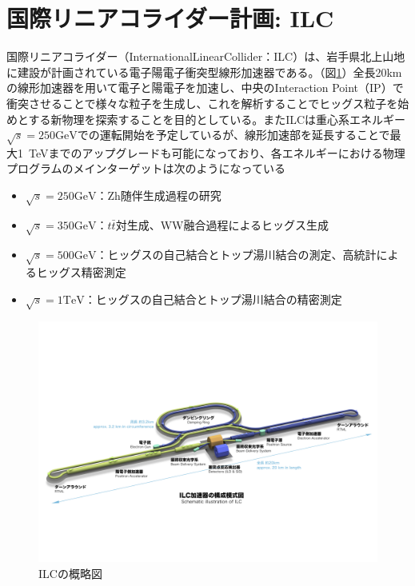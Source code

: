 \section{国際リニアコライダー計画: ILC}
国際リニアコライダー（InternationalLinearCollider：ILC）は、岩手県北上山地に建設が計画されている電子陽電子衝突型線形加速器である。（図\ref{ilc}）全長20kmの線形加速器を用いて電子と陽電子を加速し、中央のInteraction Point（IP）で衝突させることで様々な粒子を生成し、これを解析することでヒッグス粒子を始めとする新物理を探索することを目的としている。またILCは重心系エネルギー$\sqrt{s} = 250\mathrm{GeV}$での運転開始を予定しているが、線形加速部を延長することで最大1\ TeVまでのアップグレードも可能になっており、各エネルギーにおける物理プログラムのメインターゲットは次のようになっている\\
\begin{itemize}
\item $\sqrt{s} = 250 \mathrm{GeV}$：Zh随伴生成過程の研究
\item $\sqrt{s} = 350 \mathrm{GeV}$：$t\bar{t}$対生成、WW融合過程によるヒッグス生成
\item $\sqrt{s} = 500 \mathrm{GeV}$：ヒッグスの自己結合とトップ湯川結合の測定、高統計によるヒッグス精密測定
\item $\sqrt{s} = 1 \mathrm{TeV}$：ヒッグスの自己結合とトップ湯川結合の精密測定
\end{itemize}
\begin{figure}[t]
	\begin{center}
 \includegraphics[keepaspectratio, scale=0.4]
 	{Figure/Introduction/ilc.jpg}
 		\caption{ILCの概略図}
 		\label{ilc}
	\end{center}
\end{figure}
